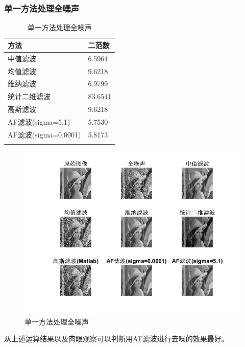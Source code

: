 \documentclass[a4paper,left=2.5cm,right=2.5cm]{article}
\begin{document}
\begin{spacing}{1.6}
		\subsubsection{单一方法处理全噪声}
		\begin{longtable}{ll}
			\hline
			方法&二范数\\
			\hline
			中值滤波&6.5964\\
			均值滤波&9.6218\\
			维纳滤波&6.9799\\
			统计二维滤波&83.6541\\
			高斯滤波&9.6218\\
			AF滤波(sigma=5.1)&5.7530\\
			AF滤波(sigma=0.0001)&5.8173\\
			\hline
			\caption{单一方法处理全噪声}
		\end{longtable}
		\begin{figure}[H]
			\includegraphics[width=\textwidth]{image/result_test_all2.png}
			\caption{单一方法处理全噪声}
		\end{figure}
		从上述运算结果以及肉眼观察可以判断用AF滤波进行去噪的效果最好。

\end{spacing}
\end{document}

